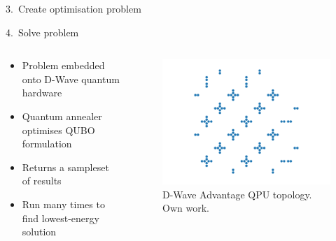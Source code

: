 \documentclass[handout]{beamer}
\begin{document}
\begin{frame}{3.\ Create optimisation problem}
    

\end{frame}

\begin{frame}{4.\ Solve problem}

    \begin{columns}
        \begin{column}{.5\textwidth}
            \begin{itemize}
                \item Problem embedded onto D-Wave quantum hardware
                \item Quantum annealer optimises QUBO formulation
                \item Returns a sampleset of results
                \item Run many times to find lowest-energy solution
            \end{itemize}
        \end{column}
        \begin{column}{.5\textwidth}
            \begin{figure}
                \includegraphics[width=\textwidth]{pegasus.pdf}
                \caption{D-Wave Advantage QPU topology. Own work.}
            \end{figure}
        \end{column}
    \end{columns}
    

\end{frame}
\end{document}
